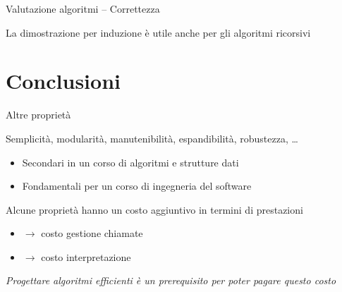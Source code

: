 \begin{frame}[shrink=7]{Valutazione algoritmi -- Correttezza}

\vspace{-9pt}
\begin{mybox}
La dimostrazione per induzione è utile anche per gli algoritmi ricorsivi
\end{mybox}

\vspace{-12pt}

\end{frame}


\section{Conclusioni}

\begin{frame}{Altre proprietà}

Semplicità, modularità, manutenibilità, espandibilità, robustezza, \ldots
\begin{itemize}
\item Secondari in un corso di algoritmi e strutture dati
\item Fondamentali per un corso di ingegneria del software
\end{itemize}

\medskip
\begin{myboxtitle}[Commento]
Alcune proprietà hanno un costo aggiuntivo in termini di prestazioni
\begin{itemize}
\item {} $\rightarrow$ costo gestione chiamate
\item {} $\rightarrow$ costo interpretazione
\end{itemize}

\bigskip
\emph{Progettare algoritmi efficienti è un prerequisito per poter pagare questo costo}
\end{myboxtitle}	
	
\end{frame}

